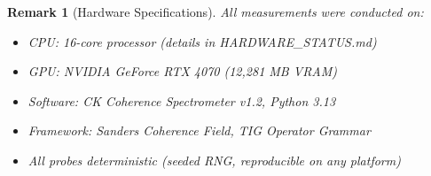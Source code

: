 \documentclass[11pt]{article}
\newtheorem{remark}[lemma]{Remark}
\begin{document}
\begin{remark}[Hardware Specifications]
All measurements were conducted on:
\begin{itemize}
\item CPU: 16-core processor (details in HARDWARE\_STATUS.md)
\item GPU: NVIDIA GeForce RTX 4070 (12,281 MB VRAM)
\item Software: CK Coherence Spectrometer v1.2, Python 3.13
\item Framework: Sanders Coherence Field, TIG Operator Grammar
\item All probes deterministic (seeded RNG, reproducible on any platform)
\end{itemize}
\end{remark}
\end{document}
